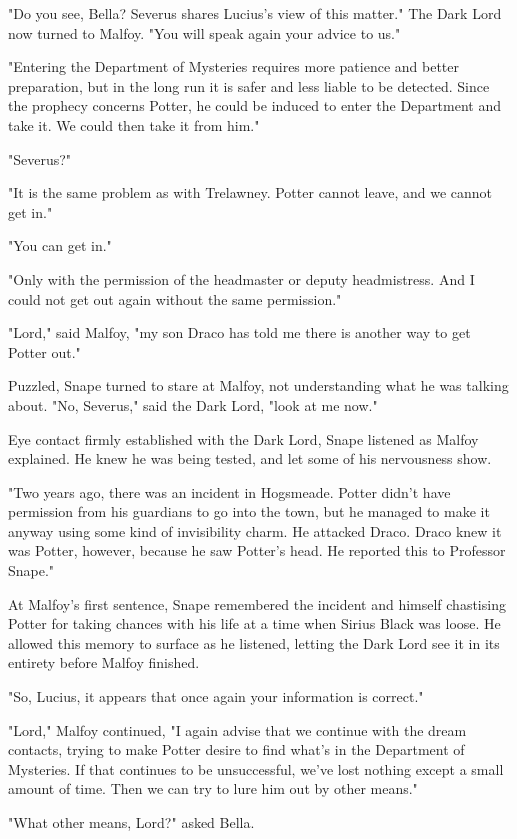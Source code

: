 "Do you see, Bella? Severus shares Lucius's view of this matter." The Dark Lord now turned to Malfoy. "You will speak again your advice to us."

"Entering the Department of Mysteries requires more patience and better preparation, but in the long run it is safer and less liable to be detected. Since the prophecy concerns Potter, he could be induced to enter the Department and take it. We could then take it from him."

"Severus?"

"It is the same problem as with Trelawney. Potter cannot leave, and we cannot get in."

"You can get in."

"Only with the permission of the headmaster or deputy headmistress. And I could not get out again without the same permission."

"Lord," said Malfoy, "my son Draco has told me there is another way to get Potter out."

Puzzled, Snape turned to stare at Malfoy, not understanding what he was talking about. "No, Severus," said the Dark Lord, "look at me now."

Eye contact firmly established with the Dark Lord, Snape listened as Malfoy explained. He knew he was being tested, and let some of his nervousness show.

"Two years ago, there was an incident in Hogsmeade. Potter didn't have permission from his guardians to go into the town, but he managed to make it anyway using some kind of invisibility charm. He attacked Draco. Draco knew it was Potter, however, because he saw Potter's head. He reported this to Professor Snape."

At Malfoy's first sentence, Snape remembered the incident and himself chastising Potter for taking chances with his life at a time when Sirius Black was loose. He allowed this memory to surface as he listened, letting the Dark Lord see it in its entirety before Malfoy finished.

"So, Lucius, it appears that once again your information is correct."

"Lord," Malfoy continued, "I again advise that we continue with the dream contacts, trying to make Potter desire to find what's in the Department of Mysteries. If that continues to be unsuccessful, we've lost nothing except a small amount of time. Then we can try to lure him out by other means."

"What other means, Lord?" asked Bella.

